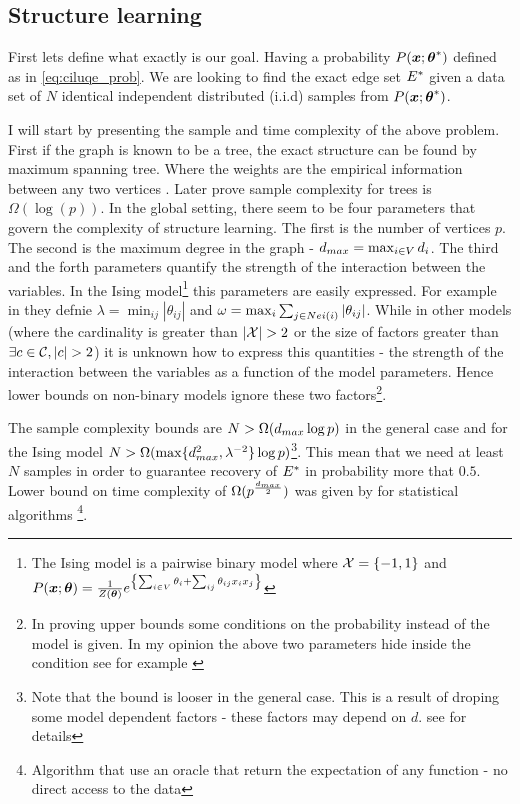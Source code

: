 \subsection{Structure learning}
First lets define what exactly is our goal.
Having a probability $P(\boldsymbol{x};{\boldsymbol{\theta}}^{*})$ defined as in \eqref{eq:ciluqe_prob}.
We are looking to find the exact edge set ${E}^{*}$ given a data set of $N$ identical independent distributed (i.i.d) samples from $P(\boldsymbol{x};{\boldsymbol{\theta}}^{*})$.

I will start by presenting the sample and time complexity of the above problem. 
First if the graph is known to be a tree, the exact structure can be found by maximum spanning tree.  Where the  weights are the empirical information between any two vertices \cite{chowLiu}. 
Later \cite{tan2011learning} prove sample complexity for trees is $\Omega(\log(p))$.
In the global setting, there seem to be four parameters that govern the complexity of structure learning.
The first is  the number of vertices $p$.
The second is the maximum degree in the graph - $d_{max} = \max_{i \in V} d_i$.
The third and the forth parameters quantify the strength of the interaction between the variables.
In the Ising model\footnote{ The Ising model is a pairwise binary model where ${\cal X} = \{-1,1\}$ and $P(\boldsymbol{x};\boldsymbol{\theta}) = \frac{1}{Z(\boldsymbol{\theta})} e^{\left\{\sum_{i \in V}\theta_i + \sum_{ij}\theta_{ij}x_ix_j\right\}}$} this parameters are easily expressed.
For example in \cite{santhanam2012information} they defnie $\lambda = \min_{ij} |\theta_{ij}|$ and $\omega = \max_i \sum_{j \in Nei(i)} |\theta_{ij}|$.
While in other models (where the cardinality is greater than $|\cX|>2$ or the size of factors greater than $\exists c \in \cC, |c|>2$) it is unknown how to express this quantities - the strength of the interaction between the variables as a function of the model parameters.
Hence lower bounds  on non-binary models ignore these two factors\footnote{In proving upper bounds some conditions on the probability instead of the model is given. In my opinion the above two parameters hide inside the condition see for example \cite{bresler2008reconstruction}}.

The sample complexity bounds are $N > \Omega(d_{max} \log p)$ in the general case and for the Ising model $N > \Omega(\max\{d_{max}^2, \lambda^{-2}\}\log p)$\footnote{Note that the bound is looser in the general case. This is a result of droping some model dependent factors - these factors may depend on $d$. see \cite{bresler2008reconstruction} for details}.
This mean that we need at least $N$ samples in order to guarantee recovery of ${E}^{*}$ in probability more that $0.5$.
Lower bound on time complexity of $\Omega(p^{\frac{d_{max}}{2}})$ was given by \cite{bresler2014structure} for statistical algorithms \cite{feldman2013statistical}\footnote{Algorithm that use an oracle that return the expectation of any function - no direct access to the data}.

